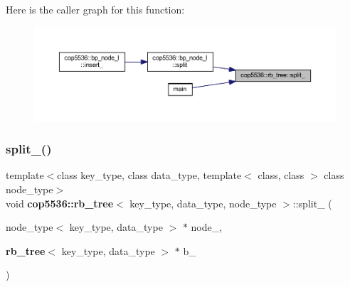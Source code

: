 Here is the caller graph for this function\+:
\nopagebreak
\begin{figure}[H]
\begin{center}
\leavevmode
\includegraphics[width=350pt]{classcop5536_1_1rb__tree_a151086d7353f49ad234479f032bac486_icgraph}
\end{center}
\end{figure}
\mbox{\label{classcop5536_1_1rb__tree_a574a8ef5b671eb36e951168ebfc63426}} 
\subsubsection{split\_()\hspace{0.1cm}{\footnotesize\ttfamily [2/2]}}
{\footnotesize\ttfamily template$<$class key\+\_\+type, class data\+\_\+type, template$<$ class, class $>$ class node\+\_\+type$>$ \\
void \textbf{ cop5536\+::rb\+\_\+tree}$<$ key\+\_\+type, data\+\_\+type, node\+\_\+type $>$\+::split\+\_\+ (\begin{DoxyParamCaption}\item[{node\+\_\+type$<$ key\+\_\+type, data\+\_\+type $>$ $\ast$}]{node\+\_\+,  }\item[{\textbf{ rb\+\_\+tree}$<$ key\+\_\+type, data\+\_\+type $>$ $\ast$}]{b\+\_\+ }\end{DoxyParamCaption})\hspace{0.3cm}{\ttfamily [inline]}}

\mbox{\label{classcop5536_1_1rb__tree_a361bb204c7f748f0e8acd91497041085}} 
